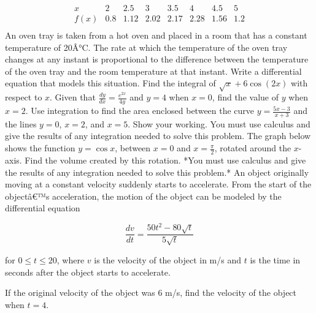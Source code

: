 \documentclass[12pt,addpoints]{exam}
\begin{document}
\begin{questions}
\[
\begin{array}{c|ccccccc}
x & 2 & 2.5 & 3 & 3.5 & 4 & 4.5 & 5 \\
\hline
f(x) & 0.8 & 1.12 & 2.02 & 2.17 & 2.28 & 1.56 & 1.2 \\
\end{array}
\]
\fillwithlines{5cm}
\question[5] An oven tray is taken from a hot oven and placed in a room that has a constant temperature of 20Â°C. The rate at which the temperature of the oven tray changes at any instant is proportional to the difference between the temperature of the oven tray and the room temperature at that instant. Write a differential equation that models this situation.
\fillwithlines{5cm}
\question[5] Find the integral of \(\sqrt{x} + 6 \cos(2x)\) with respect to \(x\).
\fillwithlines{5cm}
\question[5] Given that \(\frac{dy}{dx} = \frac{e^{2x}}{4y}\) and \(y = 4\) when \(x = 0\), find the value of \(y\) when \(x = 2\).
\fillwithlines{5cm}
\question[5] Use integration to find the area enclosed between the curve \( y = \frac{5x - 3}{x + 3} \) and the lines \( y = 0 \), \( x = 2 \), and \( x = 5 \). Show your working. You must use calculus and give the results of any integration needed to solve this problem.
\fillwithlines{5cm}
\question[5] The graph below shows the function \( y = \cos x \), between \( x = 0 \) and \( x = \frac{\pi}{2} \), rotated around the \( x \)-axis. Find the volume created by this rotation. *You must use calculus and give the results of any integration needed to solve this problem.*
\fillwithlines{5cm}
\question[5] An object originally moving at a constant velocity suddenly starts to accelerate. From the start of the objectâ€™s acceleration, the motion of the object can be modeled by the differential equation

\[ \frac{dv}{dt} = \frac{50t^2 - 80\sqrt{t}}{5\sqrt{t}} \]

for \( 0 \leq t \leq 20 \), where \( v \) is the velocity of the object in m/s and \( t \) is the time in seconds after the object starts to accelerate.

If the original velocity of the object was 6 m/s, find the velocity of the object when \( t = 4 \).


\end{questions}
\end{document}
